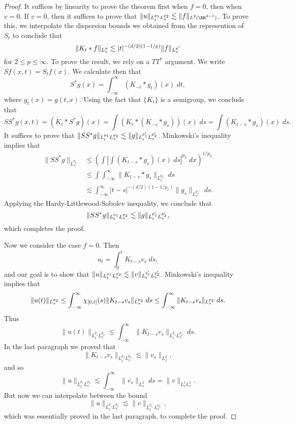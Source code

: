 \begin{proof}
  It suffices by linearity to prove the theorem first when $f = 0$, then when $v = 0$. If $v = 0$, then it suffices to prove that $\| u \|_{\smash{L^{p_1}_t L^{p_2}_x}} \lesssim \| f \|_{\smash{L^2(\RR^{d-1})}}$. To prove this, we interpolate the dispersion bounds we obtained from the represention of $S_t$ to conclude that
  \[ \| K_t * f \|_{\smash{L^p_x}} \lesssim |t|^{-(d/2)(1 - 1/p)} \| f \|_{\smash{L^{p'}_x}} \]
  for $2 \leq p \leq \infty$. To prove the result, we rely on a $TT^*$ argument. We write $Sf(x,t) = S_tf(x)$. We calculate then that
  \[ S^*g(x) = \int_{-\infty}^\infty (K_{-t} * g_t)(x)\; dt, \]
  where $g_t(x) = g(t,x)$. Using the fact that $\{ K_t \}$ is a semigroup, we conclude that
  \[ SS^*g(x,t) = (K_t * S^*g)(x) = \int (K_t * (K_{-s} * g_s))(x)\; ds = \int (K_{t-s} * g_s)(x)\; ds. \]
  It suffices to prove that $\| SS^* g \|_{\smash{L^{p_1}_t L^{p_2}_x}} \lesssim \| g \|_{\smash{L^{p_1'}_t L^{p_2'}_x}}$.  Minkowski's inequality implies that
  \begin{align*}
    \| SS^* g \|_{L^{p_2}_x} &\leq \left( \int \left| \int (K_{t-s} * g_s)(x)\; ds \right|^{p_2}\; dx \right)^{1/p_2}\\
    &\leq \int \int_{-\infty}^\infty \| K_{t-s} * g_s \|_{L^{p_2}_x}\; ds\\
    &\lesssim \int_{-\infty}^\infty |t - s|^{-(d/2)(1 - 1/p_2)} \| g_s \|_{L^{p_2'}_x}\; ds.
  \end{align*}
  Applying the Hardy-Littlewood-Sobolev inequality, we conclude that
  \[ \| SS^* g \|_{\smash{L^{p_1}_t L^{p_2}_x}} \lesssim \| g \|_{\smash{L^{p_1'}_t L^{p_2'}_x}}, \]
  which completes the proof.

  Now we consider the case $f = 0$. Then
  \[ u_t = \int_0^t K_{t-s} v_s\; ds, \]
  and our goal is to show that $\| u \|_{\smash{L^{p_1}_t L^{p_2}_x}} \lesssim \| v \|_{\smash{L^{q_1'}_t L^{q_2'}_x}}$. Minkowski's inequality implies that
  \[ \| u(t) \|_{\smash{L^{p_2}_x}} \leq \int_{-\infty}^\infty \chi_{[0,t]}(s) \| K_{t-s} v_s \|_{\smash{L^{p_2}_x}}\; ds \leq \int_{-\infty}^\infty \| K_{t-s} v_s \|_{\smash{L^{p_2}_x}}\; ds. \]
  Thus
  \[ \| u(t) \|_{L^{p_1}_t L^{p_2}_x} \leq \int_{-\infty}^\infty \| K_{t-s} v_s \|_{L^{p_1}_t L^{p_2}_x}\; ds. \]
  In the last paragraph we proved that
  \[ \| K_{t-s} v_s \|_{L^{p_1}_t L^{p_2}_x} \lesssim \| v_s \|_{L^2_x}, \]
  and so
  \[ \| u \|_{L^{p_1}_t L^{p_2}_x} \lesssim \int_{-\infty}^\infty \| v_s \|_{L^2_x}\; ds = \| v \|_{L^1_t L^2_x}. \]
  But now we can interpolate between the bound
  \[ \| u \|_{L^{p_1}_t L^{p_2}_x} \lesssim \| v \|_{L^{p_1'}_t L^{p_2'}_x}, \]
  which was essentially proved in the last paragraph, to complete the proof.
\end{proof}

